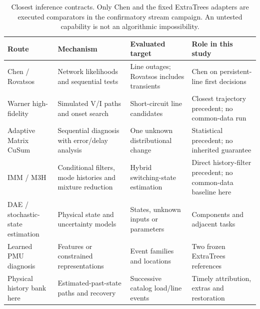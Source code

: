 \begin{table}[t]\centering\small
\caption{Closest inference contracts. Only Chen and the fixed ExtraTrees
adapters are executed comparators in the confirmatory stream campaign.
An untested capability is not an algorithmic impossibility.}
\label{tab:literature-capability}
\begin{tabularx}{\textwidth}{@{}lXXX@{}}\toprule
Route & Mechanism & Evaluated target & Role in this study\\\midrule
Chen / Rovatsos & Network likelihoods and sequential tests & Line outages; Rovatsos includes transients & Chen on persistent-line first decisions\\
Warner high-fidelity & Simulated V/I paths and onset search & Short-circuit line candidates & Closest trajectory precedent; no common-data run\\
Adaptive Matrix CuSum & Sequential diagnosis with error/delay analysis & One unknown distributional change & Statistical precedent; no inherited guarantee\\
IMM / M3H & Conditional filters, mode histories and mixture reduction & Hybrid switching-state estimation & Direct history-filter precedent; no common-data baseline here\\
DAE / stochastic-state estimation & Physical state and uncertainty models & States, unknown inputs or parameters & Components and adjacent tasks\\
Learned PMU diagnosis & Features or constrained representations & Event families and locations & Two frozen ExtraTrees references\\
Physical history bank here & Estimated-past-state paths and recovery & Successive catalog load/line events & Timely attribution, extras and restoration\\\bottomrule
\end{tabularx}\end{table}
